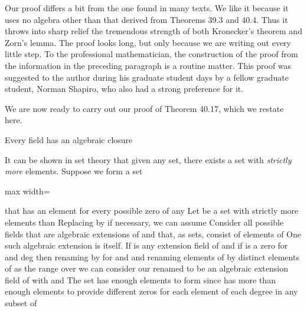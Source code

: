 \documentclass[11pt,oneside]{article}
\begin{document}
\begin{BookBody}
Our proof differs a bit from the one found in many texts. We like it because it uses no algebra other than that derived from Theorems 39.3 and 40.4. Thus it throws into sharp relief the tremendous strength of both Kronecker’s theorem and Zorn’s lemma. The proof looks long, but only because we are writing out every little step. To the professional mathematician, the construction of the proof from the information in the preceding paragraph is a routine matter. This proof was suggested to the author during his graduate student days by a fellow graduate student, Norman Shapiro, who also had a strong preference for it.

We are now ready to carry out our proof of Theorem 40.17, which we restate here.

Every field  has an algebraic closure 

 It can be shown in set theory that given any set, there exists a set with\textit{ strictly more} elements. Suppose we form a set

\begin{center}\begin{adjustbox}{max width=\linewidth}\end{adjustbox}\end{center}

\noindent that has an element for every possible zero of any  Let \BookInline{\Omega } be a set with strictly more elements than  Replacing \BookInline{\Omega } by  if necessary, we can assume  Consider all possible fields that are algebraic extensions of  and that, as sets, consist of elements of  One such algebraic extension is  itself. If  is any extension field of  and if  is a zero  for  and deg then renaming \BookInline{\gamma } by \BookInline{\omega } for \BookInline{\omega \in \Omega } and  and renaming elements  of  by distinct elements of \BookInline{\Omega } as the  range over  we can consider our renamed  to be an algebraic extension field  of  with  and  The set \BookInline{\Omega } has enough elements to form  since \BookInline{\Omega } has more than enough elements to provide  different zeros for each element of each degree  in any subset of 


\end{BookBody}
\end{document}
